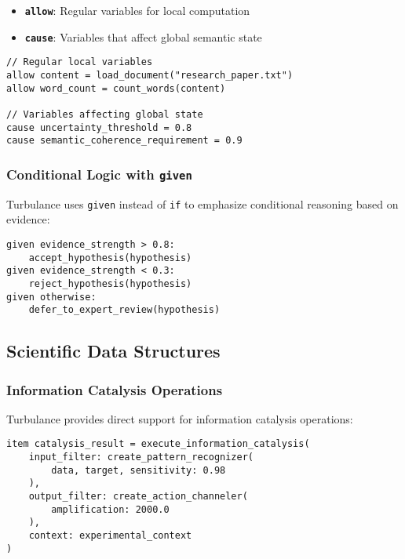 \documentclass[12pt,a4paper,twoside]{article}
\begin{document}
\begin{itemize}
\begin{itemize}
\item \textbf{\texttt{allow}}: Regular variables for local computation
\item \textbf{\texttt{cause}}: Variables that affect global semantic state
\end{itemize}

\begin{lstlisting}[caption=Variable Declaration Types]
// Regular local variables
allow content = load_document("research_paper.txt")
allow word_count = count_words(content)

// Variables affecting global state
cause uncertainty_threshold = 0.8
cause semantic_coherence_requirement = 0.9
\end{lstlisting}

\subsubsection{Conditional Logic with \texttt{given}}

Turbulance uses \texttt{given} instead of \texttt{if} to emphasize conditional reasoning based on evidence:

\begin{lstlisting}[caption=Evidence-Based Conditional Logic]
given evidence_strength > 0.8:
    accept_hypothesis(hypothesis)
given evidence_strength < 0.3:
    reject_hypothesis(hypothesis)
given otherwise:
    defer_to_expert_review(hypothesis)
\end{lstlisting}

\subsection{Scientific Data Structures}

\subsubsection{Information Catalysis Operations}

Turbulance provides direct support for information catalysis operations:

\begin{lstlisting}[caption=Information Catalysis Syntax]
item catalysis_result = execute_information_catalysis(
    input_filter: create_pattern_recognizer(
        data, target, sensitivity: 0.98
    ),
    output_filter: create_action_channeler(
        amplification: 2000.0
    ),
    context: experimental_context
)
\end{lstlisting}


\end{itemize}
\end{document}

